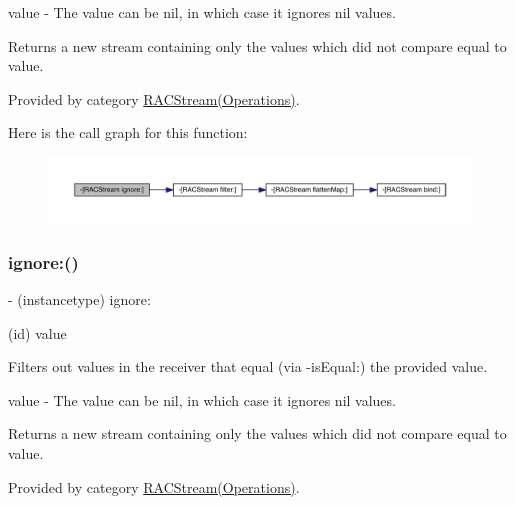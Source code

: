 value -\/ The value can be {\ttfamily nil}, in which case it ignores {\ttfamily nil} values.

Returns a new stream containing only the values which did not compare equal to {\ttfamily value}. 

Provided by category \mbox{\hyperlink{category_r_a_c_stream_07_operations_08_aa0bf73c86006176e745390ee2b3645b2}{R\+A\+C\+Stream(\+Operations)}}.

Here is the call graph for this function\+:\nopagebreak
\begin{figure}[H]
\begin{center}
\leavevmode
\includegraphics[width=350pt]{interface_r_a_c_stream_aa0bf73c86006176e745390ee2b3645b2_cgraph}
\end{center}
\end{figure}
\mbox{\label{interface_r_a_c_stream_aa0bf73c86006176e745390ee2b3645b2}} 
\subsubsection{\texorpdfstring{ignore\+:()}{ignore:()}\hspace{0.1cm}{\footnotesize\ttfamily [2/3]}}
{\footnotesize\ttfamily -\/ (instancetype) ignore\+: \begin{DoxyParamCaption}\item[{(id)}]{value }\end{DoxyParamCaption}}

Filters out values in the receiver that equal (via -\/is\+Equal\+:) the provided value.

value -\/ The value can be {\ttfamily nil}, in which case it ignores {\ttfamily nil} values.

Returns a new stream containing only the values which did not compare equal to {\ttfamily value}. 

Provided by category \mbox{\hyperlink{category_r_a_c_stream_07_operations_08_aa0bf73c86006176e745390ee2b3645b2}{R\+A\+C\+Stream(\+Operations)}}.

\mbox{\label{interface_r_a_c_stream_aa0bf73c86006176e745390ee2b3645b2}} 
